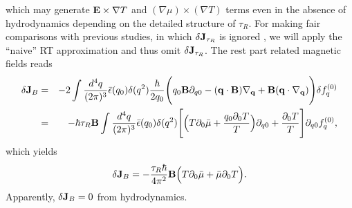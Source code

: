 \documentclass[aps,prd,showkeys,preprint,amsmath,amssymb,nofootinbib]{revtex4-1}
\begin{document}
which may generate ${\bf E}\times\nabla T$ and $(\nabla\mu)\times(\nabla T)$ terms even in the absence of hydrodynamics depending on the detailed structure of $\tau_R$. For making fair comparisons with previous studies, in which $\delta {\bf J}_{\tau_R}$ is ignored \cite{Chen:2016xtg,Gorbar:2016qfh}, we will apply the ``naive'' RT approximation and thus omit $\delta {\bf J}_{\tau_R}$. 
The rest part related magnetic fields reads
\begin{eqnarray}\nonumber
\delta {\bf J}_B&=&-2\int\frac{d^4q}{(2\pi)^3}\bar{\epsilon}(q_0)\delta(q^2)\frac{\hbar}{2q_0}\Bigg(q_0{\bf B}\partial_{q0}
-({\bf q\cdot B})\nabla_{\bf q}+{\bf B}({\bf q}\cdot\nabla_{\bf q})
\Bigg)
\delta f^{(0)}_q
\\\nonumber
&=&-\hbar\tau_R {\bf B}\int\frac{d^4q}{(2\pi)^3}\bar{\epsilon}(q_0)\delta(q^2)
\Bigg[\Big(T\partial_0\bar{\mu}+\frac{q_0\partial_0T}{T}\Big)\partial_{q0}
+\frac{\partial_0T}{T}
\Bigg]\partial_{q0}f^{(0)}_q,
\end{eqnarray}
which yields
\begin{eqnarray}
\delta {\bf J}_B
=-\frac{\tau_R\hbar}{4\pi^2}
{\bf B}\Big(T\partial_0\bar{\mu}+\bar{\mu}\partial_0T\Big).
\end{eqnarray}
Apparently, $\delta {\bf J}_B=0$ from hydrodynamics.
\end{document}
